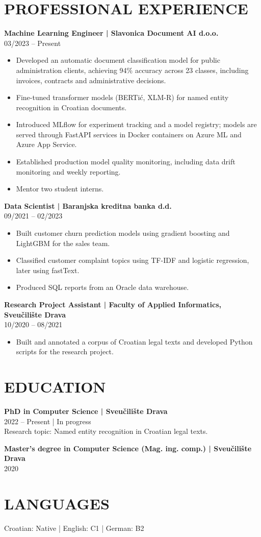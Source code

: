 \documentclass[10pt,a4paper]{article}
\newcommand{\cvsection}[1]{\section*{#1}}
\begin{document}
\cvsection{PROFESSIONAL EXPERIENCE}
\textbf{Machine Learning Engineer | Slavonica Document AI d.o.o.}\\
03/2023 -- Present
\begin{itemize}
\item Developed an automatic document classification model for public administration clients, achieving 94\% accuracy across 23 classes, including invoices, contracts and administrative decisions.
\item Fine-tuned transformer models (BERTić, XLM-R) for named entity recognition in Croatian documents.
\item Introduced MLflow for experiment tracking and a model registry; models are served through FastAPI services in Docker containers on Azure ML and Azure App Service.
\item Established production model quality monitoring, including data drift monitoring and weekly reporting.
\item Mentor two student interns.
\end{itemize}
\textbf{Data Scientist | Baranjska kreditna banka d.d.}\\
09/2021 -- 02/2023
\begin{itemize}
\item Built customer churn prediction models using gradient boosting and LightGBM for the sales team.
\item Classified customer complaint topics using TF-IDF and logistic regression, later using fastText.
\item Produced SQL reports from an Oracle data warehouse.
\end{itemize}
\textbf{Research Project Assistant | Faculty of Applied Informatics, Sveučilište Drava}\\
10/2020 -- 08/2021
\begin{itemize}
\item Built and annotated a corpus of Croatian legal texts and developed Python scripts for the research project.
\end{itemize}

\cvsection{EDUCATION}
\textbf{PhD in Computer Science | Sveučilište Drava}\\
2022 -- Present | In progress\\
Research topic: Named entity recognition in Croatian legal texts.

\textbf{Master's degree in Computer Science (Mag. ing. comp.) | Sveučilište Drava}\\
2020

\cvsection{LANGUAGES}
Croatian: Native | English: C1 | German: B2
\end{document}
